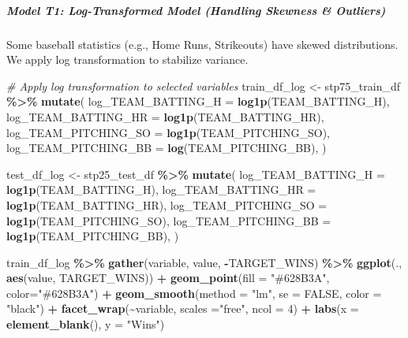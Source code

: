 \documentclass[
]{article}
\newenvironment{Shaded}{\begin{snugshade}}{\end{snugshade}}
\newcommand{\AttributeTok}[1]{\textcolor[rgb]{0.13,0.29,0.53}{#1}}
\newcommand{\CommentTok}[1]{\textcolor[rgb]{0.56,0.35,0.01}{\textit{#1}}}
\newcommand{\ConstantTok}[1]{\textcolor[rgb]{0.56,0.35,0.01}{#1}}
\newcommand{\DecValTok}[1]{\textcolor[rgb]{0.00,0.00,0.81}{#1}}
\newcommand{\FunctionTok}[1]{\textcolor[rgb]{0.13,0.29,0.53}{\textbf{#1}}}
\newcommand{\NormalTok}[1]{#1}
\newcommand{\OtherTok}[1]{\textcolor[rgb]{0.56,0.35,0.01}{#1}}
\newcommand{\SpecialCharTok}[1]{\textcolor[rgb]{0.81,0.36,0.00}{\textbf{#1}}}
\newcommand{\StringTok}[1]{\textcolor[rgb]{0.31,0.60,0.02}{#1}}
\begin{document}
\subparagraph{Model T1: Log-Transformed Model (Handling Skewness \&
Outliers)}\label{model-t1-log-transformed-model-handling-skewness-outliers}

Some baseball statistics (e.g., Home Runs, Strikeouts) have skewed
distributions. We apply log transformation to stabilize variance.

\begin{Shaded}
\begin{Highlighting}[]
\CommentTok{\# Apply log transformation to selected variables}
\NormalTok{train\_df\_log }\OtherTok{\textless{}{-}}\NormalTok{ stp75\_train\_df }\SpecialCharTok{\%\textgreater{}\%}
  \FunctionTok{mutate}\NormalTok{(}
    \AttributeTok{log\_TEAM\_BATTING\_H =} \FunctionTok{log1p}\NormalTok{(TEAM\_BATTING\_H),}
    \AttributeTok{log\_TEAM\_BATTING\_HR =} \FunctionTok{log1p}\NormalTok{(TEAM\_BATTING\_HR),}
    \AttributeTok{log\_TEAM\_PITCHING\_SO =} \FunctionTok{log1p}\NormalTok{(TEAM\_PITCHING\_SO),}
    \AttributeTok{log\_TEAM\_PITCHING\_BB =} \FunctionTok{log}\NormalTok{(TEAM\_PITCHING\_BB),}
\NormalTok{  )}

\NormalTok{test\_df\_log }\OtherTok{\textless{}{-}}\NormalTok{ stp25\_test\_df }\SpecialCharTok{\%\textgreater{}\%}
  \FunctionTok{mutate}\NormalTok{(}
    \AttributeTok{log\_TEAM\_BATTING\_H =} \FunctionTok{log1p}\NormalTok{(TEAM\_BATTING\_H),}
    \AttributeTok{log\_TEAM\_BATTING\_HR =} \FunctionTok{log1p}\NormalTok{(TEAM\_BATTING\_HR),}
    \AttributeTok{log\_TEAM\_PITCHING\_SO =} \FunctionTok{log1p}\NormalTok{(TEAM\_PITCHING\_SO),}
    \AttributeTok{log\_TEAM\_PITCHING\_BB =} \FunctionTok{log1p}\NormalTok{(TEAM\_PITCHING\_BB),}
\NormalTok{  )}

\NormalTok{train\_df\_log }\SpecialCharTok{\%\textgreater{}\%}
  \FunctionTok{gather}\NormalTok{(variable, value, }\SpecialCharTok{{-}}\NormalTok{TARGET\_WINS) }\SpecialCharTok{\%\textgreater{}\%}
  \FunctionTok{ggplot}\NormalTok{(., }\FunctionTok{aes}\NormalTok{(value, TARGET\_WINS)) }\SpecialCharTok{+} 
  \FunctionTok{geom\_point}\NormalTok{(}\AttributeTok{fill =} \StringTok{"\#628B3A"}\NormalTok{, }\AttributeTok{color=}\StringTok{"\#628B3A"}\NormalTok{)  }\SpecialCharTok{+} 
  \FunctionTok{geom\_smooth}\NormalTok{(}\AttributeTok{method =} \StringTok{"lm"}\NormalTok{, }\AttributeTok{se =} \ConstantTok{FALSE}\NormalTok{, }\AttributeTok{color =} \StringTok{"black"}\NormalTok{) }\SpecialCharTok{+} 
  \FunctionTok{facet\_wrap}\NormalTok{(}\SpecialCharTok{\textasciitilde{}}\NormalTok{variable, }\AttributeTok{scales =}\StringTok{"free"}\NormalTok{, }\AttributeTok{ncol =} \DecValTok{4}\NormalTok{) }\SpecialCharTok{+}
  \FunctionTok{labs}\NormalTok{(}\AttributeTok{x =} \FunctionTok{element\_blank}\NormalTok{(), }\AttributeTok{y =} \StringTok{"Wins"}\NormalTok{)}
\end{Highlighting}
\end{Shaded}
\end{document}
